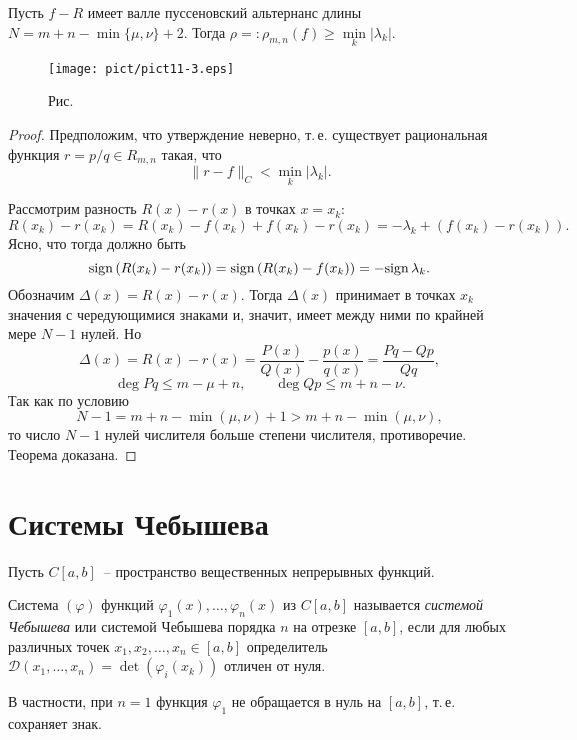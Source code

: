 \begin{teo}
Пусть $f-R$ имеет валле пуссеновский альтернанс длины $N=m+n-\min
\{\mu,\nu\}+2.$ Тогда $\rho=:\rho_{m,n}(f)\ge \min\limits_k|\lambda_k|.$
\end{teo}

 \bigskip
\begin{figure}[ht]
\begin{center}
\texttt{[image: pict/pict11-3.eps]}
\end{center}
 \bigskip
 \label{r11-3}

 \centerline{Рис.~\theris}
 \bigskip
\end{figure}



\begin{proof}
Предположим, что утверждение неверно, т.\,е. существует рациональная функция
$r = p/q \in R_{m,n}$ такая, что
$$
\|r-f\|_C<\min_{k}|\lambda_k|.
$$

Рассмотрим разность $R(x)-r(x)$ в точках $x=x_k$:
$$
R(x_k)-r(x_k)=R(x_k)-f(x_k)+f(x_k)-r(x_k)=-\lambda_k+(f(x_k)-r(x_k)).
$$
Ясно, что тогда должно быть
$$
{\rm sign \, } (R(x_k)-r(x_k))={\rm sign \, } (R(x_k)-f(x_k))=-{\rm sign \, } \lambda_k.
$$
Обозначим $\Delta(x)=R(x)-r(x).$ Тогда $\Delta(x)$ принимает в точках
$x_k$ значения с чередующимися знаками и, значит, имеет между ними по
крайней мере $N-1$ нулей. Но
$$
\Delta(x)=R(x)-r(x)=\frac{P(x)}{Q(x)}-\frac{p(x)}{q(x)}=
\frac{Pq-Qp}{Qq},
$$
$$
\deg Pq\le m-\mu +n,\qquad \deg Qp\le m+n-\nu.
$$
Так как по условию
$$
N-1=m+n-\min(\mu,\nu)+1>m+n-\min(\mu,\nu),
$$
то число $N-1$ нулей числителя больше степени числителя, противоречие. Теорема доказана.
\end{proof}


\section{Системы Чебышева}

Пусть $C[a,b]$~-- пространство вещественных непрерывных  функций.

Система $(\varphi)$ функций $\varphi_1(x),\ldots,\varphi_n(x)$ из $C[a,b]$
называется {\it системой Чебышева} или системой Чебышева порядка $n$
на отрезке $[a,b]$, если для любых различных точек $x_1,x_2,\ldots,x_n\in [a,b]$
определитель $\mathcal D(x_1,\ldots,x_n)=\det(\varphi_i(x_k))$
отличен от нуля.

В частности, при $n=1$ функция $\varphi_1$ не обращается в нуль на $[a,b]$, т.\,е. сохраняет знак.

